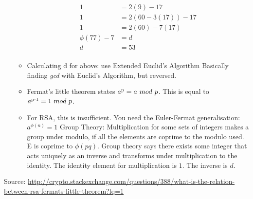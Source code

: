 \documentclass{article}
\begin{document}
\begin{itemize}
\begin{itemize}
\begin{align*}
          1 &= 2(9) - 17 \\
          1 &= 2(60 - 3(17)) - 17 \\
          1 &= 2(60) - 7(17) \\
          \phi(77) - 7 &= d \\
          d &= 53 \\
      \end{align*}
      \item Calculating d for above: use Extended Euclid's Algorithm 
        \subitem Basically finding \emph{gcd} with Euclid's Algorithm, but reversed.
      \item Fermat's little theorem states $ a\textsuperscript{p} = a\ mod\ p $. This is equal to
        $ a\textsuperscript{p-1}=1\ mod\ p $. 
      \item For RSA, this is insufficient. You need the Euler-Fermat generalisation:
        \subitem $a^{\phi(n)} = 1$
        \subitem Group Theory: Multiplication for some sets of integers makes a group under modulo, if all the elements are coprime to the modulo used.
        \subitem E is coprime to $\phi(pq)$. Group theory says there exists some integer that acts uniquely as an inverse and transforms
        under multiplication to the identity.
        \subitem The identity element for multiplication is $1$. The inverse is $d$.
    \end{itemize}
  \end{itemize}
  Source: \url{http://crypto.stackexchange.com/questions/388/what-is-the-relation-between-rsa-fermats-little-theorem?lq=1}
\end{document}
